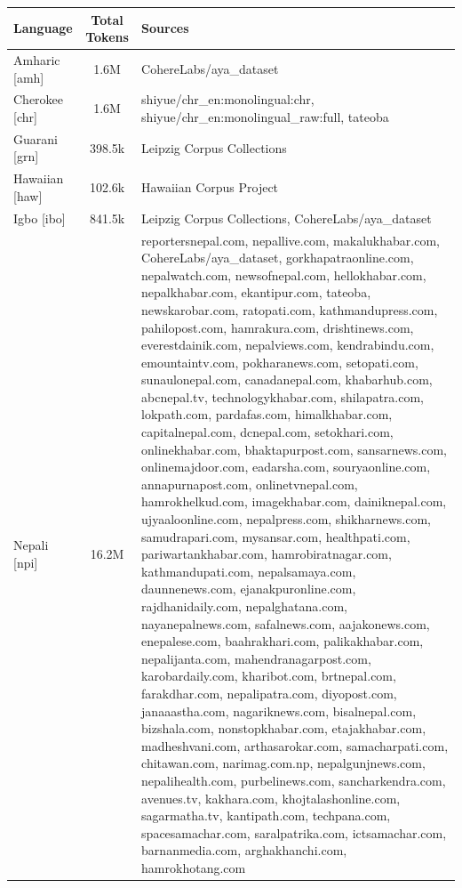 \begin{table}[h!]
    \small
    \centering
        \begin{tabular}{l c l}
            \toprule
            \textbf{Language} & \textbf{Total Tokens} & \textbf{Sources} \\
            \midrule
            Amharic [amh] & 1.6M & CohereLabs/aya_dataset \\ 
            Cherokee [chr] & 1.6M & shiyue/chr_en:monolingual:chr, shiyue/chr_en:monolingual_raw:full, tateoba \\ 
            Guarani [grn] & 398.5k & Leipzig Corpus Collections \\ 
            Hawaiian [haw] & 102.6k & Hawaiian Corpus Project \\ 
            Igbo [ibo] & 841.5k & Leipzig Corpus Collections, CohereLabs/aya_dataset \\ 
            Nepali [npi] & 16.2M & reportersnepal.com, nepallive.com, makalukhabar.com, CohereLabs/aya_dataset, gorkhapatraonline.com, nepalwatch.com, newsofnepal.com, hellokhabar.com, nepalkhabar.com, ekantipur.com, tateoba, newskarobar.com, ratopati.com, kathmandupress.com, pahilopost.com, hamrakura.com, drishtinews.com, everestdainik.com, nepalviews.com, kendrabindu.com, emountaintv.com, pokharanews.com, setopati.com, sunaulonepal.com, canadanepal.com, khabarhub.com, abcnepal.tv, technologykhabar.com, shilapatra.com, lokpath.com, pardafas.com, himalkhabar.com, capitalnepal.com, dcnepal.com, setokhari.com, onlinekhabar.com, bhaktapurpost.com, sansarnews.com, onlinemajdoor.com, eadarsha.com, souryaonline.com, annapurnapost.com, onlinetvnepal.com, hamrokhelkud.com, imagekhabar.com, dainiknepal.com, ujyaaloonline.com, nepalpress.com, shikharnews.com, samudrapari.com, mysansar.com, healthpati.com, pariwartankhabar.com, hamrobiratnagar.com, kathmandupati.com, nepalsamaya.com, daunnenews.com, ejanakpuronline.com, rajdhanidaily.com, nepalghatana.com, nayanepalnews.com, safalnews.com, aajakonews.com, enepalese.com, baahrakhari.com, palikakhabar.com, nepalijanta.com, mahendranagarpost.com, karobardaily.com, kharibot.com, brtnepal.com, farakdhar.com, nepalipatra.com, diyopost.com, janaaastha.com, nagariknews.com, bisalnepal.com, bizshala.com, nonstopkhabar.com, etajakhabar.com, madheshvani.com, arthasarokar.com, samacharpati.com, chitawan.com, narimag.com.np, nepalgunjnews.com, nepalihealth.com, purbelinews.com, sancharkendra.com, avenues.tv, kakhara.com, khojtalashonline.com, sagarmatha.tv, kantipath.com, techpana.com, spacesamachar.com, saralpatrika.com, ictsamachar.com, barnanmedia.com, arghakhanchi.com, hamrokhotang.com \\ 

\end{tabular}
\end{table}

